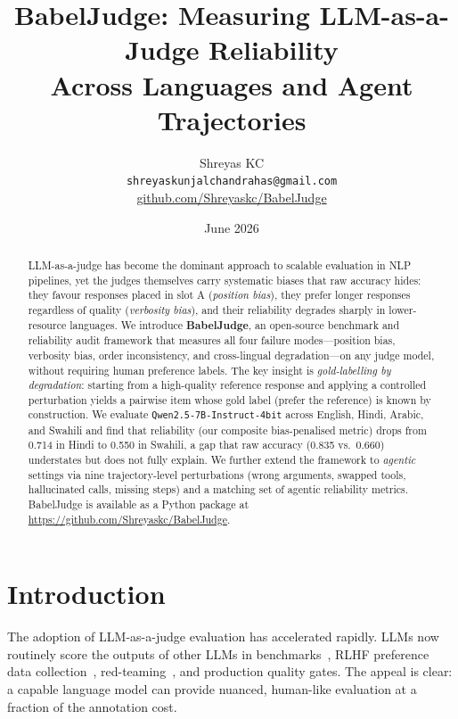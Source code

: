 \documentclass[11pt]{article}
\title{\textbf{BabelJudge}: Measuring LLM-as-a-Judge Reliability\\Across Languages and Agent Trajectories}
\author{
    Shreyas KC \\
    \texttt{shreyaskunjalchandrahas@gmail.com} \\
    \href{https://github.com/Shreyaskc/BabelJudge}{github.com/Shreyaskc/BabelJudge}
}
\date{June 2026}
\begin{document}
\maketitle

\begin{abstract}
LLM-as-a-judge has become the dominant approach to scalable evaluation in NLP pipelines, yet the judges themselves carry systematic biases that raw accuracy hides: they favour responses placed in slot A (\textit{position bias}), they prefer longer responses regardless of quality (\textit{verbosity bias}), and their reliability degrades sharply in lower-resource languages. We introduce \textbf{BabelJudge}, an open-source benchmark and reliability audit framework that measures all four failure modes—position bias, verbosity bias, order inconsistency, and cross-lingual degradation—on any judge model, without requiring human preference labels. The key insight is \emph{gold-labelling by degradation}: starting from a high-quality reference response and applying a controlled perturbation yields a pairwise item whose gold label (prefer the reference) is known by construction. We evaluate \texttt{Qwen2.5-7B-Instruct-4bit} across English, Hindi, Arabic, and Swahili and find that reliability (our composite bias-penalised metric) drops from 0.714 in Hindi to 0.550 in Swahili, a gap that raw accuracy (0.835 vs.\ 0.660) understates but does not fully explain. We further extend the framework to \emph{agentic} settings via nine trajectory-level perturbations (wrong arguments, swapped tools, hallucinated calls, missing steps) and a matching set of agentic reliability metrics. BabelJudge is available as a Python package at \url{https://github.com/Shreyaskc/BabelJudge}.
\end{abstract}

\section{Introduction}
\label{sec:intro}

The adoption of LLM-as-a-judge evaluation has accelerated rapidly. LLMs now routinely score the outputs of other LLMs in benchmarks~\cite{zheng2023judging}, RLHF preference data collection~\cite{ouyang2022training}, red-teaming~\cite{perez2022red}, and production quality gates. The appeal is clear: a capable language model can provide nuanced, human-like evaluation at a fraction of the annotation cost.
\end{document}
